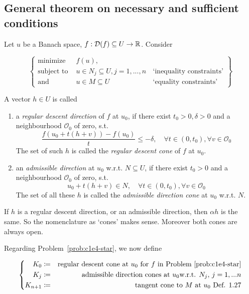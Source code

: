 \documentclass[../skript.tex]{subfiles}
\begin{document}
\subsection{General theorem on necessary and sufficient conditions}

Let $u$ be a Banach space, $f:\mathcal{D}(f)\subseteq U\to\mathbb{R}$. Consider \par

\begin{equation}\label{prob:c1e4-star}
	\left\{
	\begin{aligned}
	\text{minimize } & f(u),\quad &\\
	\text{subject to }&u\in N_j\subseteq U, j=1,...,n\,&\text{`inequality constraints'} \\
	\text{and } & u\in M\subseteq U&\text{`equality constraints'}
	\end{aligned}
	\right\}
\end{equation}

\begin{definition}
	A vector $h\in U$ is called 
	\begin{enumerate}
		\item a \emph{regular descent direction} of $f$ at $u_0$, if there exist $t_0 > 0, \delta>0$ and a neighbourhood $\mathcal{O}_0$ of zero, s.t.
			\[
				\frac{f(u_0+t(h+v)) - f(u_0)}{t}\leq -\delta,\quad\forall t\in (0,t_0),\forall v\in \mathcal{O}_0
			\]
			The set of such $h$ is called the \emph{regular descent cone} of $f$ at $u_0$.
		\item an \emph{admissible direction} at $u_0$ w.r.t. $N\subseteq U$, if there exist $t_0>0$ and a neighbourhood $\mathcal{O}_0$ of zero, s.t.
			\[
				u_0 + t(h+v)\in N,\quad \forall t\in (0,t_0),\forall v\in \mathcal{O}_0
			\]
			The set of all these $h$ is called the \emph{admissible direction cone} at $u_0$ w.r.t. $N$.
	\end{enumerate}
\end{definition}
\begin{remark*} 
	If $h$ is a regular descent direction, or an admissible direction, then $\alpha h$ is the same. So the nomenclature as `cones' makes sense. Moreover both cones are always open.
\end{remark*}

Regarding Problem~\ref{prob:c1e4-star}, we now define

\begin{equation*}
	\left\{
	\begin{aligned}
	K_0 &\coloneqq& \text{regular descent cone at } u_0\text{ for }f \text{ in Problem~\ref{prob:c1e4-star}}\\
	K_j &\coloneqq& \text{admissible direction cones at }u_0\text{w.r.t. }N_j,\,j=1,...n\\
	K_{n+1}&\coloneqq& \text{tangent cone to }M\text{ at }u_0\text{ Def. 1.27} %
	\end{aligned}
	\right.
\end{equation*}
\end{document}
